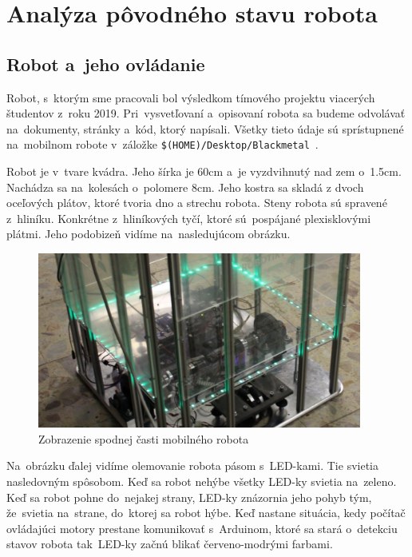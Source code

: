 \section{Analýza pôvodného stavu robota}
\label{sec:formerState}

\subsection{Robot a~jeho ovládanie}
\label{subsec:robotAOvladanie}

Robot, s~ktorým sme pracovali bol výsledkom tímového projektu viacerých študentov \newline z~roku 2019. Pri~vysvetľovaní
a~opisovaní robota sa budeme odvolávať na~dokumenty, stránky a~kód, ktorý napísali. Všetky tieto údaje sú sprístupnené
na~mobilnom robote v~záložke \newline \texttt{\$(HOME)/Desktop/Blackmetal}~\cite{timovyProjekt}.

Robot je v~tvare kvádra. Jeho šírka je 60cm a~je vyzdvihnutý nad zem o~1.5cm. Nachádza sa na~kolesách o~polomere 8cm.
Jeho kostra sa skladá z dvoch oceľových plátov, ktoré tvoria dno a strechu robota. Steny robota sú spravené z~hliníku.
Konkrétne z~hliníkových tyčí, ktoré sú~pospájané plexisklovými plátmi. Jeho podobizeň vidíme na~nasledujúcom
obrázku.

\begin{figure}[!htbp]
	\begin{center}
		\includegraphics[width=0.95\textwidth]{img/robot.png}
	\end{center}
	\caption{Zobrazenie spodnej časti mobilného robota~\cite{timovyProjekt}}
	\label{fig:robot}
\end{figure}

Na~obrázku ďalej vidíme olemovanie robota pásom s~LED-kami. Tie svietia nasledovným spôsobom. Keď sa robot nehýbe všetky LED-ky svietia
na~zeleno. Keď sa robot pohne do~nejakej strany, LED-ky znázornia jeho pohyb tým, že~svietia na~strane, do~ktorej sa robot hýbe. Keď nastane
situácia, kedy počítač ovládajúci motory prestane komunikovať s~Arduinom, ktoré sa stará o~detekciu stavov robota tak~LED-ky začnú blikať
červeno-modrými farbami.

